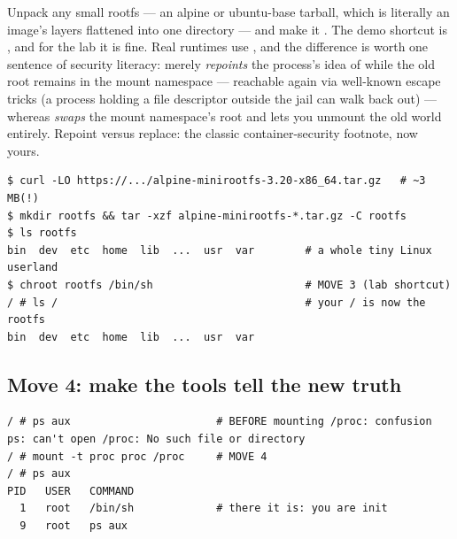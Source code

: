 Unpack any small rootfs — an alpine or ubuntu-base tarball, which is literally an image's layers flattened into one directory — and make it \code{/\allowbreak }. The demo shortcut is , and for the lab it is fine. Real runtimes use , and the difference is worth one sentence of security literacy:  merely \textit{repoints} the process's idea of \code{/\allowbreak } while the old root remains in the mount namespace — reachable again via well-known escape tricks (a process holding a file descriptor outside the jail can walk back out) — whereas  \textit{swaps} the mount namespace's root and lets you unmount the old world entirely. Repoint versus replace: the classic container-security footnote, now yours.

\begin{terminalbox}
\begin{Verbatim}[breaklines=true,breakanywhere=true,fontsize=\small,formatcom=\color{tbbtermfg},codes=\tbbcodeactive]
$ curl -LO https://.../alpine-minirootfs-3.20-x86_64.tar.gz   # ~3 MB(!)
$ mkdir rootfs && tar -xzf alpine-minirootfs-*.tar.gz -C rootfs
$ ls rootfs
bin  dev  etc  home  lib  ...  usr  var        # a whole tiny Linux userland
$ chroot rootfs /bin/sh                        # MOVE 3 (lab shortcut)
/ # ls /                                       # your / is now the rootfs
bin  dev  etc  home  lib  ...  usr  var
\end{Verbatim}
\end{terminalbox}

\subsection*{Move 4: make the tools tell the new truth}

\begin{terminalbox}
\begin{Verbatim}[breaklines=true,breakanywhere=true,fontsize=\small,formatcom=\color{tbbtermfg},codes=\tbbcodeactive]
/ # ps aux                       # BEFORE mounting /proc: confusion
ps: can't open /proc: No such file or directory
/ # mount -t proc proc /proc     # MOVE 4
/ # ps aux
PID   USER   COMMAND
  1   root   /bin/sh             # there it is: you are init
  9   root   ps aux
\end{Verbatim}
\end{terminalbox}

